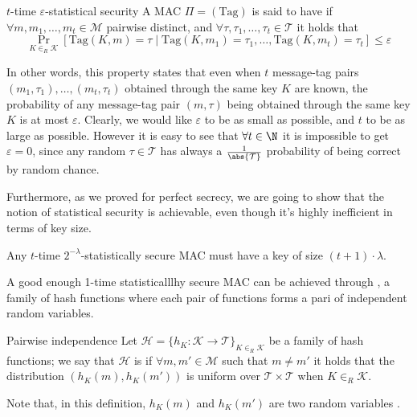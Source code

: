 \documentclass[a4paper, 12pt]{report}
\begin{document}
\begin{frameddefn}{$t$-time $\varepsilon$-statistical security}
	A MAC $\Pi = (\mbox{Tag})$ is said to have  if $\forall m, m_1, \ldots, m_t \in \mathcal M$ pairwise distinct, and $\forall \tau, \tau_1, \ldots, \tau_t \in \mathcal T$ it holds that $$\Pr_{K \in_R \mathcal K}[\mbox{Tag}(K, m) = \tau \mid \mbox{Tag}(K, m_1) = \tau_1, \ldots, \mbox{Tag}(K, m_t) = \tau_t] \le \varepsilon$$
\end{frameddefn}

In other words, this property states that even when $t$ message-tag pairs $(m_1, \tau_1), \ldots, (m_t, \tau_t)$ obtained through the same key $K$ are known, the probability of any message-tag pair $(m, \tau)$ being obtained through the same key $K$ is at most $\varepsilon$. Clearly, we would like $\varepsilon$ to be as small as possible, and $t$ to be as large as possible. However it is easy to see that $\forall t \in \N$ it is impossible to get $\varepsilon = 0$, since any random $\tau \in \mathcal T$ has always a $\tfrac{1}{\abs {\mathcal T}}$ probability of being correct by random chance.

Furthermore, as we proved for perfect secrecy, we are going to show that the notion of  statistical security is achievable, even though it's highly inefficient in terms of key size.

\begin{framedthm}{}
	Any $t$-time $2^{-\lambda}$-statistically secure MAC must have a key of size $(t + 1) \cdot \lambda$.
\end{framedthm}

A good enough 1-time statisticalllhy secure MAC can be achieved through , a family of hash functions where each pair of functions forms a pari of independent random variables.

\begin{frameddefn}{Pairwise independence}
	Let $\mathcal H = \{h_K : \mathcal K \to \mathcal T\}_{K \in_R \mathcal K}$ be a family of hash functions; we say that $\mathcal H$ is  if $\forall m, m' \in \mathcal M$ such that $m \neq m'$ it holds that the distribution $(h_K(m), h_K(m'))$ is uniform over $\mathcal T \times \mathcal T$ when $K \in_R \mathcal K$.
\end{frameddefn}

Note that, in this definition, $h_K(m)$ and $h_K(m')$ are two random variables .
\end{document}
